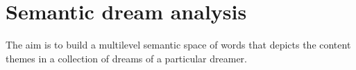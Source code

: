 \documentclass[xcolor=x11names,compress]{beamer}
\begin{document}
\section{Semantic dream analysis}
{
\begin{frame}[c]{}
    \centering
    \begin{minipage}{\textwidth} \centering
    {\LARGE {\color{redUnicam}{Semantic analysis of dreams}}}
    \end{minipage}
    \newline \newline
    \begin{minipage}{\textwidth} \centering
    {The aim is to build a multilevel semantic space of words that depicts the content themes in a collection of
    dreams of a particular dreamer.}
    \end{minipage}
\end{frame}}
\end{document}
